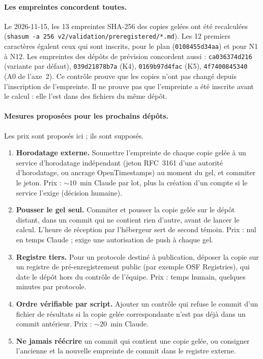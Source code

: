 \paragraph{Les empreintes concordent toutes.} Le 2026-11-15, les 13\mesure{} empreintes SHA-256
des copies gelées ont été recalculées (\texttt{shasum -a 256 v2/validation/preregistered/*.md}).
Les 12\suppose{} premiers caractères égalent ceux qui sont inscrits, pour le plan
(\texttt{0108455d34aa}) et pour N1 à N12. Les empreintes des dépôts de prévision concordent aussi :
\texttt{ca036374d216} (variante par défaut), \texttt{039d21878b7a} (K4), \texttt{0169b97d4fac} (K5),
\texttt{4f7400845340} (A0 de l'axe~2). Ce contrôle prouve que les copies n'ont pas changé depuis
l'inscription de l'empreinte. Il ne prouve pas que l'empreinte a été inscrite avant le calcul :
elle l'est dans des fichiers du même dépôt.

\paragraph{Mesures proposées pour les prochains dépôts.} Les prix sont proposés ici ; ils sont
supposés\suppose.
\begin{enumerate}
  \item \textbf{Horodatage externe.} Soumettre l'empreinte de chaque copie gelée à un service
        d'horodatage indépendant (jeton RFC~3161 d'une autorité d'horodatage, ou ancrage
        OpenTimestamps) au moment du gel, et commiter le jeton. Prix : $\sim 10$\suppose{}~min
        Claude par lot, plus la création d'un compte si le service l'exige (décision humaine).
  \item \textbf{Pousser le gel seul.} Commiter et pousser la copie gelée sur le dépôt distant,
        dans un commit qui ne contient rien d'autre, avant de lancer le calcul. L'heure de
        réception par l'hébergeur sert de second témoin. Prix : nul en temps Claude ; exige une
        autorisation de push à chaque gel.
  \item \textbf{Registre tiers.} Pour un protocole destiné à publication, déposer la copie sur un
        registre de pré-enregistrement public (par exemple OSF Registries), qui date le dépôt
        hors du contrôle de l'équipe. Prix : temps humain, quelques minutes par protocole.
  \item \textbf{Ordre vérifiable par script.} Ajouter un contrôle qui refuse le commit d'un
        fichier de résultats si la copie gelée correspondante n'est pas déjà dans un commit
        antérieur. Prix : $\sim 20$\suppose{}~min Claude.
  \item \textbf{Ne jamais réécrire} un commit qui contient une copie gelée, ou consigner
        l'ancienne et la nouvelle empreinte de commit dans le registre externe.
\end{enumerate}

